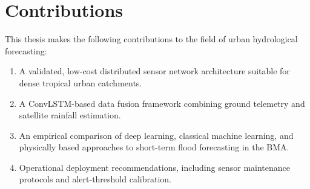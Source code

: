 \section{Contributions}
This thesis makes the following contributions to the field of urban hydrological forecasting:

\begin{enumerate}[leftmargin=1.6em]
  \item A validated, low-cost distributed sensor network architecture suitable for dense tropical urban catchments.
  \item A ConvLSTM-based data fusion framework combining ground telemetry and satellite rainfall estimation.
  \item An empirical comparison of deep learning, classical machine learning, and physically based approaches to short-term flood forecasting in the BMA.
  \item Operational deployment recommendations, including sensor maintenance protocols and alert-threshold calibration.
\end{enumerate}
